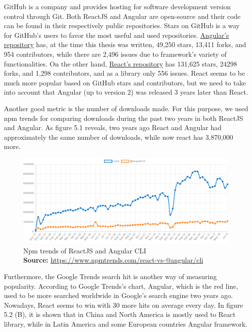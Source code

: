 GitHub is a company and provides hosting for software development version control through Git. Both ReactJS and Angular are open-source and their code can be found in their respectively public repositories. Stars on GitHub is a way for GitHub's users to favor the most useful and used repositories. \href{https://github.com/angular/angular}{Angular's repository} has, at the time this thesis was written, 49,250 stars, 13,411 forks, and 954 contributors, while there are 2,496 issues due to framework's variety of functionalities. On the other hand, \href{https://github.com/facebook/react/}{React's repository} has 131,625 stars, 24298 forks, and 1,298 contributors, and as a library only 556 issues. React seems to be much more popular based on GitHub stars and contributors, but we need to take into account that Angular (up to version 2) was released 3 years later than React. \par

Another good metric is the number of downloads made. For this purpose, we used npm trends for comparing downloads during the past two years in both ReactJS and Angular. As figure 5.1 reveals, two years ago React and Angular had approximately the same number of downloads, while now react has 3,870,000 more. 

\begin{figure}[H]
	\begin{center}
		\includegraphics[scale=0.3]{images/npm-trends-react-vs-angular.png}
	\end{center}
	\caption{
		Npm trends of ReactJS and Angular CLI
		\\
		\textbf{Source:} \url{https://www.npmtrends.com/react-vs-@angular/cli}
	}
\end{figure}

Furthermore, the Google Trends search hit is another way of measuring popularity. According to Google Trends's chart, Angular, which is the red line, used to be more searched worldwide in Google's search engine two years ago. Nowadays, React seems to win with 30 more hits on average every day. In figure 5.2 (B), it is shown that in China and North America is mostly used to React library, while in Latin America and some European countries Angular framework.

